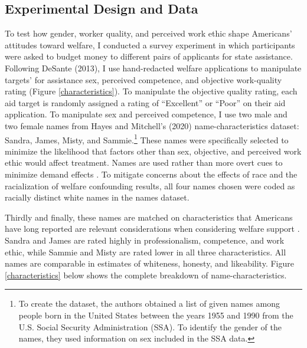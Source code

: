 \documentclass[12pt]{article}%
\begin{document}
\begin{doublespace}
\section*{Experimental Design and Data}
To test how gender, worker quality, and perceived work ethic shape Americans’ attitudes toward welfare, I conducted a survey experiment in which participants were asked to budget money to different pairs of applicants for state assistance. Following DeSante (2013), I use hand-redacted welfare applications to manipulate targets’ for assistance sex, perceived competence, and objective work-quality rating (Figure \ref{characteristics}). To manipulate the objective quality rating, each aid target is randomly assigned a rating of ``Excellent” or ``Poor” on their aid application. To manipulate sex and perceived competence, I use two male and two female names from Hayes and Mitchell’s (2020) name-characteristics dataset: Sandra, James, Misty, and Sammie.\footnote{To create the dataset, the authors obtained a list of given names among people born in the United States between the years 1955 and 1990 from the U.S. Social Security Administration (SSA). To identify the gender of the names, they used information on sex included in the SSA data.} These names were specifically selected to minimize the likelihood that factors other than sex, objective, and perceived work ethic would affect treatment. Names are used rather than more overt cues to minimize demand effects \citep{quidt_experimenter_2019}. To mitigate concerns about the effects of race and the racialization of welfare confounding results, all four names chosen were coded as racially distinct white names in the \cite{hayes_2020} names dataset.


Thirdly and finally, these names are matched on characteristics that Americans have long reported are relevant considerations when considering welfare support \citep{bobocel_justice-based_1998, katz_racial_1988, sniderman_symbolic_1986, sniderman_beyond_1996, mclosky_ethos}. Sandra and James are rated highly in professionalism, competence, and work ethic, while Sammie and Misty are rated lower in all three characteristics. All names are comparable in estimates of whiteness, honesty, and likeability. Figure \ref{characteristics} below shows the complete breakdown of name-characteristics.


\end{doublespace}
\end{document}
